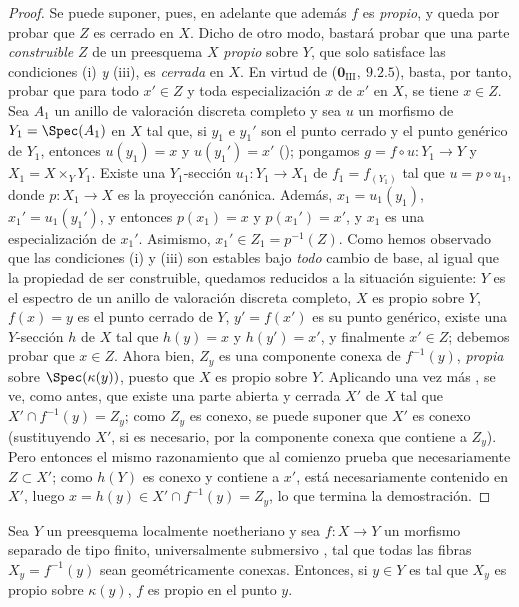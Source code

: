 \begin{proof}
Se puede suponer, pues, en adelante que además $f$ es \emph{propio}, y queda por probar que $Z$ es cerrado en $X$.
Dicho de otro modo, bastará probar que una parte \emph{construible} $Z$ de un preesquema $X$ \emph{propio} sobre $Y$, que solo satisface las condiciones (i) \emph{y} (iii), es \emph{cerrada} en $X$.
En virtud de ($\mathbf{0}_{\mathrm{III}},~9.2.5$), basta, por tanto, probar que para todo $x'\in Z$ y toda especialización $x$ de $x'$ en $X$, se tiene $x\in Z$.
Sea $A_1$ un anillo de valoración discreta completo y sea $u$ un morfismo de $Y_1=\Spec(A_1)$ en $X$ tal que, si $y_1$ e $y_1'$ son el punto cerrado y el punto genérico de $Y_1$, entonces $u(y_1)=x$ y $u(y_1')=x'$ (); pongamos $g=f\circ u:Y_1\to Y$ y $X_1=X\times_Y Y_1$. Existe una $Y_1$-sección $u_1:Y_1\to X_1$ de $f_1=f_{(Y_1)}$ tal que $u=p\circ u_1$, donde $p:X_1\to X$ es la proyección canónica.
Además, $x_1=u_1(y_1)$, $x_1'=u_1(y_1')$, y entonces $p(x_1)=x$ y $p(x_1')=x'$, y $x_1$ es una especialización de $x_1'$.
Asimismo, $x_1'\in Z_1=p^{-1}(Z)$. Como hemos observado que las condiciones (i) y (iii) son estables bajo \emph{todo} cambio de base, al igual que la propiedad de ser construible, quedamos reducidos a la situación siguiente: $Y$ es el espectro de un anillo de valoración discreta completo, $X$ es propio sobre $Y$, $f(x)=y$ es el punto cerrado de $Y$, $y'=f(x')$ es su punto genérico, existe una $Y$-sección $h$ de $X$ tal que $h(y)=x$ y $h(y')=x'$, y finalmente $x'\in Z$; debemos probar que $x\in Z$.
Ahora bien, $Z_y$ es una componente conexa de $f^{-1}(y)$, \emph{propia} sobre $\Spec(\kappa(y))$, puesto que $X$ es propio sobre $Y$.
Aplicando una vez más , se ve, como antes, que existe una parte abierta y cerrada $X'$ de $X$ tal que $X'\cap f^{-1}(y)=Z_y$; como $Z_y$ es conexo,
se puede suponer que $X'$ es conexo (sustituyendo $X'$, si es necesario, por la componente conexa que contiene a $Z_y$).
Pero entonces el mismo razonamiento que al comienzo prueba que necesariamente $Z\subset X'$; como $h(Y)$ es conexo y contiene a $x'$, está necesariamente contenido en $X'$, luego $x=h(y)\in X'\cap f^{-1}(y)=Z_y$, lo que termina la demostración.
\end{proof}

\begin{corollary}[15.7.10]
\label{IV.15.7.10}
Sea $Y$ un preesquema localmente noetheriano y sea $f:X\to Y$ un morfismo separado de tipo finito, universalmente submersivo , tal que todas las fibras $X_y=f^{-1}(y)$ sean geométricamente conexas.
Entonces, si $y\in Y$ es tal que $X_y$ es propio sobre $\kappa(y)$, $f$ es propio en el punto $y$.
\end{corollary}

